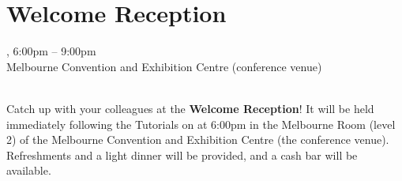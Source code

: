 \clearpage
\section[Welcome Reception]{Welcome Reception}
\setheaders{}{\daydateyear}

\begin{center}


\daydateyear, 6:00pm -- 9:00pm \vspace{1em}\\
Melbourne Convention and Exhibition Centre (conference venue)\\
\WelcomeReceptionLoc\\
\end{center}

\noindent Catch up with your colleagues at the \textbf{Welcome
Reception}! It will be held immediately following the Tutorials
on \daydate at 6:00pm in the Melbourne Room (level 2) of the 
Melbourne Convention and Exhibition Centre (the conference venue).  
Refreshments and a light dinner will be provided, and a cash bar 
will be available.
